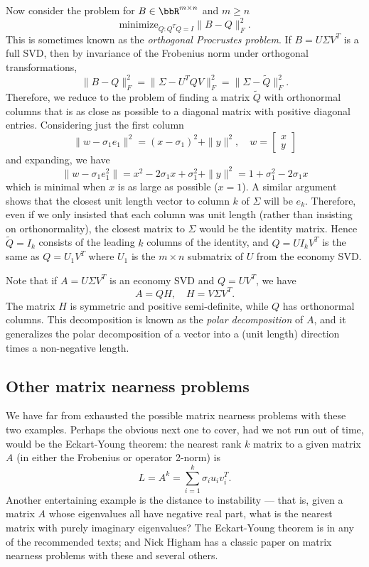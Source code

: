 Now consider the problem for $B \in \bbR^{m \times n}$ and $m \geq n$
\[
  \mbox{minimize}_{Q : Q^T Q = I} \|B-Q\|_F^2.
\]
This is sometimes known as the {\em orthogonal Procrustes problem}.
If $B = U \Sigma V^T$ is a full SVD, then by invariance of the
Frobenius norm under orthogonal transformations,
\[
  \|B-Q\|_F^2 = \|\Sigma-U^T Q V\|_F^2 = \|\Sigma-\tilde{Q}\|_F^2.
\]
Therefore, we reduce to the problem of finding a matrix $\tilde{Q}$
with orthonormal columns that is as close as possible to a
diagonal matrix with positive diagonal entries.  Considering just
the first column
\[
  \|w-\sigma_1 e_1\|^2 = (x-\sigma_1)^2 + \|y\|^2, \quad
  w = \begin{bmatrix} x \\ y \end{bmatrix}
\]
and expanding, we have
\[
  \|w-\sigma_1 e_1^2\| = x^2 - 2 \sigma_1 x + \sigma_1^2 + \|y\|^2
  = 1 + \sigma_1^2 - 2 \sigma_1 x
\]
which is minimal when $x$ is as large as possible ($x = 1$).
A similar argument shows that the closest unit length vector to
column $k$ of $\Sigma$ will be $e_k$.  Therefore,
even if we only insisted that each column was unit length (rather than
insisting on orthonormality), the closest matrix to $\Sigma$ would be
the identity matrix.  Hence $\tilde{Q} = I_k$ consists of the leading
$k$ columns of the identity, and $Q = U I_k V^T$ is the same as
$Q = U_1 V^T$ where $U_1$ is the $m \times n$ submatrix of $U$ from
the economy SVD.

Note that if $A = U \Sigma V^T$ is an economy SVD and $Q = UV^T$,
we have
\[
  A = QH, \quad H = V \Sigma V^T.
\]
The matrix $H$ is symmetric and positive semi-definite, while $Q$
has orthonormal columns.  This decomposition is known as the
{\em polar decomposition} of $A$, and it generalizes
the polar decomposition of a vector into a (unit length) direction
times a non-negative length.

\subsection{Other matrix nearness problems}

We have far from exhausted the possible matrix nearness problems
with these two examples.  Perhaps the obvious next one to cover,
had we not run out of time, would be the Eckart-Young theorem:
the nearest rank $k$ matrix to a given matrix $A$ (in either the
Frobenius or operator 2-norm) is
\[
  L = A^k = \sum_{i=1}^k \sigma_i u_i v_i^T.
\]
Another entertaining example is the distance to instability ---
that is, given a matrix $A$ whose eigenvalues all have negative
real part, what is the nearest matrix with purely imaginary eigenvalues?
The Eckart-Young theorem is in any of the recommended texts; and
Nick Higham has a classic paper on matrix nearness problems with these
and several others.
